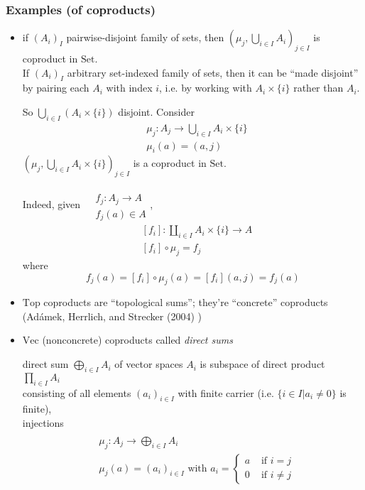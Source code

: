 \documentclass[10pt]{amsart}
\begin{document}
\begin{multicols*}{2}
\subsubsection{Examples (of coproducts)} 

\begin{itemize}
	\item if $(A_i)_I$ pairwise-disjoint family of sets, then $(\mu_j, \bigcup_{i\in I} A_i)_{j\in I}$ is coproduct in $\text{Set}$.  \\
	If $(A_i)_I$ arbitrary set-indexed family of sets, then it can be ``made disjoint'' by pairing each $A_i$ with index $i$, i.e. by working with $A_i \times \lbrace i \rbrace$ rather than $A_i$.  
	
	So $\bigcup_{i\in I } (A_i \times \lbrace i \rbrace)$ disjoint.  Consider 
	\[
	\begin{aligned}
	&  \mu_j : A_j \to \bigcup_{i \in I} A_i \times \lbrace i \rbrace \\ 
	&  \mu_i(a) = (a,j)
	\end{aligned}
	\]
	$(\mu_j, \bigcup_{i\in I} A_i \times \lbrace i \rbrace )_{j\in I}$ is a coproduct in $\text{Set}$.  
	
	Indeed, given $\begin{aligned} & \quad \\
	& f_j:A_j \to A \\
	& f_j(a) \in A \end{aligned}$, 
	\[
	\begin{aligned}
	& [f_i] : \coprod_{i\in I} A_i \times \lbrace i \rbrace \to A \\ 
	& [f_i]\circ \mu_j = f_j 
	\end{aligned}
	\]
	where
	\[
	f_j(a) = [f_i]\circ \mu_j(a) = [f_i](a,j) = f_j(a)
	\]
	\item  $\text{Top}$ coproducts are ``topological sums''; they're ``concrete'' coproducts (Ad\'{a}mek, Herrlich, and Strecker (2004) \cite{AHS2004})
	\item $\text{Vec}$ (nonconcrete) coproducts called \emph{direct sums}
	
	direct sum $\bigoplus_{i\in I} A_i$ of vector spaces $A_i$ is subspace of direct product $\prod_{i\in I} A_i$ \\
	consisting of all elements $(a_i)_{i\in I}$ with finite carrier (i.e. $\lbrace i \in I | a_i \neq 0 \rbrace$ is finite), \\
	\qquad injections \[
	\begin{aligned} & \quad \\
	& \mu_j : A_j \to \bigoplus_{i\in I } A_i  \\
	& \mu_j(a) = (a_i)_{i\in I} \text { with } a_i = \begin{cases} a & \text{ if } i = j  \\ 0 & \text{ if } i \neq j \end{cases}
	\end{aligned}
	\]
	

\end{itemize}
\end{multicols*}
\end{document}
